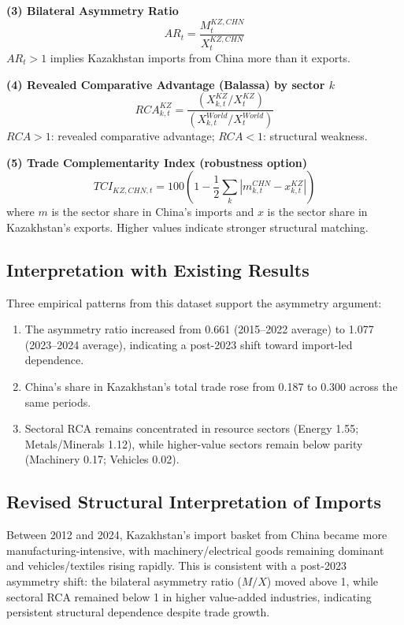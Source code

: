 \documentclass[12pt]{article}
\begin{document}
\textbf{(3) Bilateral Asymmetry Ratio}
\[
AR_t = \frac{M_t^{KZ,CHN}}{X_t^{KZ,CHN}}
\]
\(AR_t > 1\) implies Kazakhstan imports from China more than it exports.

\textbf{(4) Revealed Comparative Advantage (Balassa) by sector \(k\)}
\[
RCA_{k,t}^{KZ} =
\frac{\left(X_{k,t}^{KZ}/X_t^{KZ}\right)}
{\left(X_{k,t}^{World}/X_t^{World}\right)}
\]
\(RCA>1\): revealed comparative advantage; \(RCA<1\): structural weakness.

\textbf{(5) Trade Complementarity Index (robustness option)}
\[
TCI_{KZ,CHN,t}=100\left(1-\frac{1}{2}\sum_k\left|m_{k,t}^{CHN}-x_{k,t}^{KZ}\right|\right)
\]
where \(m\) is the sector share in China's imports and \(x\) is the sector share in Kazakhstan's exports. Higher values indicate stronger structural matching.

\subsection*{Interpretation with Existing Results}

Three empirical patterns from this dataset support the asymmetry argument:
\begin{enumerate}
\item The asymmetry ratio increased from 0.661 (2015--2022 average) to 1.077 (2023--2024 average), indicating a post-2023 shift toward import-led dependence.
\item China's share in Kazakhstan's total trade rose from 0.187 to 0.300 across the same periods.
\item Sectoral RCA remains concentrated in resource sectors (Energy 1.55; Metals/Minerals 1.12), while higher-value sectors remain below parity (Machinery 0.17; Vehicles 0.02).
\end{enumerate}

\subsection*{Revised Structural Interpretation of Imports}

Between 2012 and 2024, Kazakhstan's import basket from China became more manufacturing-intensive, with machinery/electrical goods remaining dominant and vehicles/textiles rising rapidly. This is consistent with a post-2023 asymmetry shift: the bilateral asymmetry ratio (\(M/X\)) moved above 1, while sectoral RCA remained below 1 in higher value-added industries, indicating persistent structural dependence despite trade growth.
\end{document}
